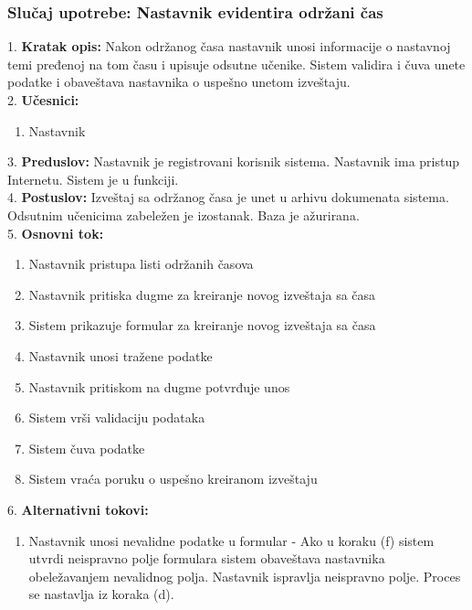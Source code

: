 \documentclass{article}
\begin{document}
\newpage
\subsubsection{Slučaj upotrebe: Nastavnik evidentira održani čas} 
1. \textbf{Kratak opis:} Nakon održanog časa nastavnik unosi informacije o nastavnoj temi pređenoj na tom času i upisuje odsutne učenike. Sistem validira i čuva unete podatke i obaveštava nastavnika o uspešno unetom izveštaju.\\

2. \textbf{Učesnici:}
\begin{enumerate} [label=(\alph*)]
\item Nastavnik
\end{enumerate} 

3. \textbf{Preduslov:} Nastavnik je registrovani korisnik sistema. Nastavnik ima pristup Internetu. Sistem je u funkciji. \\

4. \textbf{Postuslov:} Izveštaj sa održanog časa je unet u arhivu dokumenata sistema. Odsutnim učenicima zabeležen je izostanak. Baza je ažurirana. \\

5. \textbf{Osnovni tok:} 
\begin{enumerate} [label=(\alph*)]
\item Nastavnik pristupa listi održanih časova
\item Nastavnik pritiska dugme za kreiranje novog izveštaja sa časa
\item Sistem prikazuje formular za kreiranje novog izveštaja sa časa
\item Nastavnik unosi tražene podatke 
\item Nastavnik pritiskom na dugme potvrđuje unos
\item Sistem vrši validaciju podataka
\item Sistem čuva podatke
\item Sistem vraća poruku o uspešno kreiranom izveštaju
\end{enumerate}

6. \textbf{Alternativni tokovi:}
\begin{enumerate} [label=(\roman*)]
\item Nastavnik unosi nevalidne podatke u formular - Ako u koraku (f) sistem utvrdi neispravno polje formulara sistem obaveštava nastavnika obeležavanjem nevalidnog polja. Nastavnik ispravlja neispravno polje. Proces se nastavlja iz koraka (d).
\end{enumerate}
\end{document}
